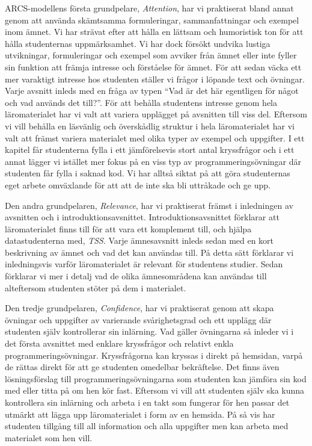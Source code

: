 \documentclass[]{article}
\begin{document}
ARCS-modellens första grundpelare, \textit{Attention}, har vi
praktiserat bland annat genom att använda skämtsamma formuleringar,
sammanfattningar och exempel inom ämnet. Vi har strävat efter att
hålla en lättsam och humoristisk ton för att hålla studenternas
uppmärksamhet. Vi har dock försökt undvika lustiga utvikningar,
formuleringar och exempel som avviker från ämnet eller inte fyller sin
funktion att främja intresse och förståelse för ämnet. För att sedan
väcka ett mer varaktigt intresse hos studenten ställer vi frågor i
löpande text och övningar. Varje avsnitt inleds med en fråga av typen
“Vad är det här egentligen för något och vad används det till?”. För
att behålla studentens intresse genom hela läromaterialet har vi valt
att variera upplägget på avsnitten till viss del. Eftersom vi vill
behålla en läsvänlig och överskådlig struktur i hela läromaterialet
har vi valt att främst variera materialet med olika typer av exempel
och uppgifter. I ett kapitel får studenterna fylla i ett jämförelsevis
stort antal kryssfrågor och i ett annat lägger vi istället mer fokus på en
viss typ av programmeringsövningar där studenten får fylla i saknad
kod. Vi har alltså siktat på att göra studenternas eget arbete
omväxlande för att att de inte ska bli uttråkade och ge upp.

Den andra grundpelaren, \textit{Relevance}, har vi praktiserat främst
i inledningen av avsnitten och i
introduktionsavsnittet. Introduktionsavsnittet förklarar att
läromaterialet finns till för att vara ett komplement till, och hjälpa
datastudenterna med, \textit{TSS}. Varje ämnesavsnitt inleds sedan med
en kort beskrivning av ämnet och vad det kan användas till. På detta
sätt förklarar vi inledningsvis varför läromaterialet är relevant för
studentens studier. Sedan förklarar vi mer i detalj vad de olika
ämnesområdena kan användas till alteftersom studenten stöter på dem i
materialet.

Den tredje grundpelaren, \textit{Confidence}, har vi praktiserat genom
att skapa övningar och uppgifter av varierande svårighetsgrad och ett
upplägg där studenten själv kontrollerar sin inlärning. Vad gäller
övningarna så inleder vi i det första avsnittet med enklare
kryssfrågor och relativt enkla programmeringsövningar. Kryssfrågorna
kan kryssas i direkt på hemsidan, varpå de rättas direkt för att ge
studenten omedelbar bekräftelse. Det finns även lösningsförslag till
programmeringsövningarna som studenten kan jämföra sin kod med eller
titta på om hen kör fast. Eftersom vi vill att studenten själv ska
kunna kontrollera sin inlärning och arbeta i en takt som fungerar för
hen passar det utmärkt att lägga upp läromaterialet i form av en
hemsida. På så vis har studenten tillgång till all information och
alla uppgifter men kan arbeta med materialet som hen vill.
\end{document}
